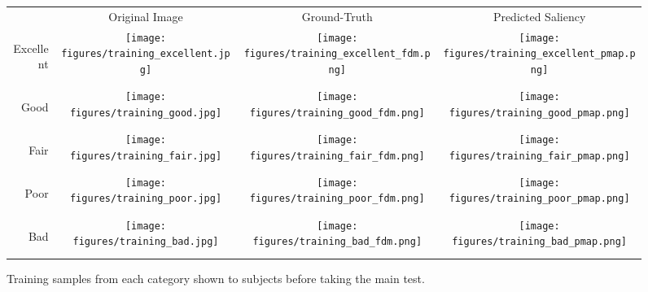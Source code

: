 \documentclass[12pt,onecolumn,journal,	draftclsnofoot]{IEEEtran}
\begin{document}
\begin{figure}[t]
	\centering
	\footnotesize
	\begin{tabular}{DCCC}
		& Original Image & Ground-Truth & Predicted Saliency \\
		\begin{turn}{90} Excellent \end{turn} & \texttt{[image: figures/training\_excellent.jpg]} & 
		\texttt{[image: figures/training\_excellent\_fdm.png]} &
		\texttt{[image: figures/training\_excellent\_pmap.png]} \\
		\begin{turn}{90} Good \end{turn} & \texttt{[image: figures/training\_good.jpg]} & 
		\texttt{[image: figures/training\_good\_fdm.png]} &
		\texttt{[image: figures/training\_good\_pmap.png]} \\
		\begin{turn}{90} Fair \end{turn} & \texttt{[image: figures/training\_fair.jpg]} & 
		\texttt{[image: figures/training\_fair\_fdm.png]} &
		\texttt{[image: figures/training\_fair\_pmap.png]} \\
		\begin{turn}{90} Poor \end{turn} & \texttt{[image: figures/training\_poor.jpg]} & 
		\texttt{[image: figures/training\_poor\_fdm.png]} &
		\texttt{[image: figures/training\_poor\_pmap.png]} \\
		\begin{turn}{90} Bad \end{turn} & \texttt{[image: figures/training\_bad.jpg]} & 
		\texttt{[image: figures/training\_bad\_fdm.png]} &
		\texttt{[image: figures/training\_bad\_pmap.png]} \\
		
		
	\end{tabular}
	\caption{Training samples from each category shown to subjects before taking the main test.}
	\label{fig:training}
\end{figure}
\end{document}
